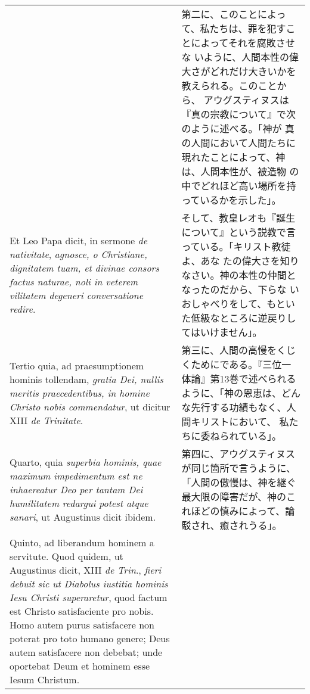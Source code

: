 \documentclass[10pt]{jsarticle} %
\begin{document}
\begin{longtable}{p{21em}p{21em}}
&

第二に、このことによって、私たちは、罪を犯すことによってそれを腐敗させな
 いように、人間本性の偉大さがどれだけ大きいかを教えられる。このことから、
 アウグスティヌスは『真の宗教について』で次のように述べる。「神が
 真の人間において人間たちに現れたことによって、神は、人間本性が、被造物
 の中でどれほど高い場所を持っているかを示した」。


\\


Et Leo Papa dicit, in sermone {\itshape de
 nativitate}, {\itshape agnosce, o Christiane, dignitatem tuam, et divinae consors
 factus naturae, noli in veterem vilitatem degeneri conversatione
 redire}. 


&

そして、教皇レオも『誕生について』という説教で言っている。「キリスト教徒よ、あな
 たの偉大さを知りなさい。神の本性の仲間となったのだから、下らな
 いおしゃべりをして、もといた低級なところに逆戻りしてはいけません」。

\\



Tertio quia, ad praesumptionem hominis tollendam, {\itshape gratia Dei,
 nullis meritis praecedentibus, in homine Christo nobis commendatur}, ut
 dicitur XIII {\itshape de Trinitate}. 


&

第三に、人間の高慢をくじくためにである。『三位一体論』第13巻で述べられる
 ように、「神の恩恵は、どんな先行する功績もなく、人間キリストにおいて、
 私たちに委ねられている」。


\\


Quarto, quia {\itshape superbia hominis, quae maximum
 impedimentum est ne inhaereatur Deo per tantam Dei humilitatem redargui
 potest atque sanari}, ut Augustinus dicit ibidem. 


&

第四に、アウグスティヌスが同じ箇所で言うように、「人間の傲慢は、神を継ぐ
 最大限の障害だが、神のこれほどの慎みによって、論駁され、癒されうる」。

\\



Quinto, ad liberandum
 hominem a servitute. Quod quidem, ut Augustinus dicit, XIII {\itshape de Trin}.,
 {\itshape fieri debuit sic ut Diabolus iustitia hominis Iesu Christi superaretur},
 quod factum est Christo satisfaciente pro nobis. Homo autem purus
 satisfacere non poterat pro toto humano genere; Deus autem satisfacere
 non debebat; unde oportebat Deum et hominem esse Iesum Christum. 



\end{longtable}
\end{document}
